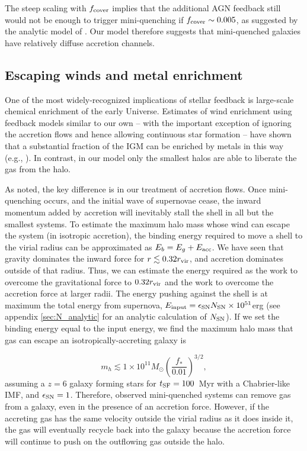 \documentclass[a4paper,11pt]{article}
\begin{document}
The steep scaling with $f_{\rm cover}$ implies that the additional AGN feedback still would not be enough to trigger mini-quenching if $f_{\rm cover} \sim 0.005$, as suggested by the analytic model of \cite{Mandelker2018}. Our model therefore suggests that mini-quenched galaxies have relatively diffuse accretion channels. 

\subsection{Escaping winds and metal enrichment} 

One of the most widely-recognized implications of stellar feedback is large-scale chemical enrichment of the early Universe. Estimates of wind enrichment using feedback models similar to our own -- with the important exception of ignoring the accretion flows and hence allowing continuous star formation -- have shown that a substantial fraction of the IGM can be enriched by metals in this way (e.g., \cite{Ferrara2000, Madau2001, Furlanetto2003_winds, Yamaguchi2023}). In contrast, in our model only the smallest halos are able to liberate the gas from the halo.

As noted, the key difference is in our treatment of accretion flows. Once mini-quenching occurs, and the initial wave of supernovae cease, the inward momentum added by accretion will inevitably stall the shell in all but the smallest systems. To estimate the maximum halo mass whose wind can escape the system (in isotropic accretion),
the binding energy required to move a shell to the virial radius can be  approximated as $E_{b} = E_{g} + E_{\rm acc}$. We have seen that gravity dominates the inward force for $r \lesssim 0.32 r_{\rm vir}$, and accretion dominates outside of that radius. Thus, we can estimate the energy required as the work to overcome the gravitational force to $0.32 r_{\rm vir}$ and the work to overcome the accretion force at larger radii. The energy pushing against the shell is at maximum the total energy from supernova, $E_{\rm input} = \epsilon_{\rm SN} N_{\rm SN}\times 10^{51}$erg (see appendix \ref{sec:N_analytic} for an analytic calculation of $N_{\rm SN}$). If we set the binding energy equal to the input energy, we find the maximum halo mass that gas can escape an isotropically-accreting galaxy is

\begin{equation}
    m_{h} \lesssim 1 \times 10^{11} M_{\odot} \left( \frac{f_{*}}{0.01} \right)^{3/2},
\end{equation}
%
assuming a $z = 6$ galaxy forming stars for $t_{\rm SF} = 100$~Myr with a Chabrier-like IMF, and $\epsilon_{\rm SN} = 1$. Therefore, observed mini-quenched systems can remove gas from a galaxy, even in the presence of an accretion force. However, if the accreting gas has the same velocity outside the virial radius as it does inside it, the gas will eventually recycle back into the galaxy because the accretion force will continue to push on the outflowing gas outside the halo.
\end{document}
